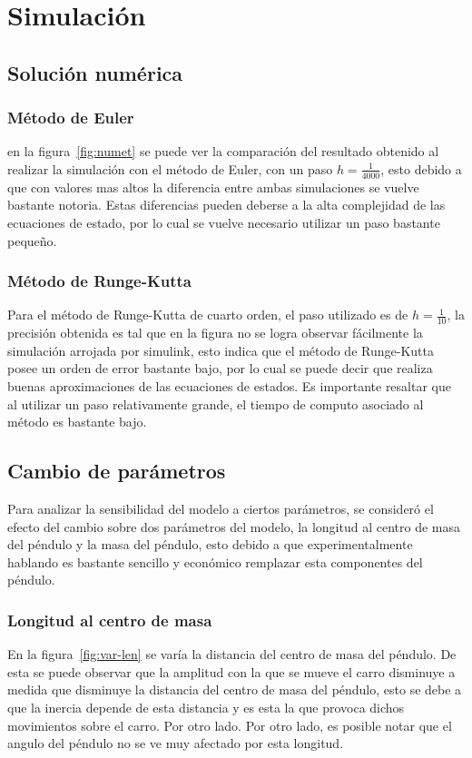\documentclass{ieeeaccess}
\begin{document}
\section{Simulación}
\subsection{Solución numérica}
\subsubsection{Método de Euler}
en la figura~\ref{fig:numet} se puede ver la comparación del resultado
obtenido al realizar la simulación con el método de Euler, con un
paso $h = \frac{1}{4000}$, esto debido a que con valores mas altos
la diferencia entre ambas simulaciones se vuelve bastante notoria.
Estas diferencias pueden deberse a la alta complejidad de las
ecuaciones de estado, por lo cual se vuelve necesario utilizar un
paso bastante pequeño.
\subsubsection{Método de Runge-Kutta}
Para el método de Runge-Kutta de cuarto orden, el paso utilizado es
de $h = \frac{1}{10}$, la precisión obtenida es tal que en la figura
no se logra observar fácilmente la simulación arrojada por simulink,
esto indica que el método de Runge-Kutta posee un orden de error
bastante bajo, por lo cual se puede decir que realiza buenas
aproximaciones de las ecuaciones de estados.
Es importante resaltar que al utilizar un paso relativamente grande,
el tiempo de computo asociado al método es bastante bajo.

\subsection{Cambio de parámetros}
Para analizar la sensibilidad del modelo a ciertos parámetros, se
consideró el efecto del cambio sobre dos parámetros del modelo,
la longitud al centro de masa del péndulo y la masa del péndulo,
esto debido a que experimentalmente hablando es bastante sencillo y
económico remplazar esta componentes del péndulo.
\subsubsection{Longitud al centro de masa}
En la figura~\ref{fig:var-len} se varía la distancia del centro de masa
del péndulo. De esta se puede observar que la amplitud con la que se
mueve el carro disminuye a medida que disminuye la distancia del centro
de masa del péndulo, esto se debe a que la inercia depende de esta
distancia y es esta la que provoca dichos movimientos sobre el carro.
Por otro lado. Por otro lado, es posible notar que el angulo del péndulo
no se ve muy afectado por esta longitud.
\end{document}
